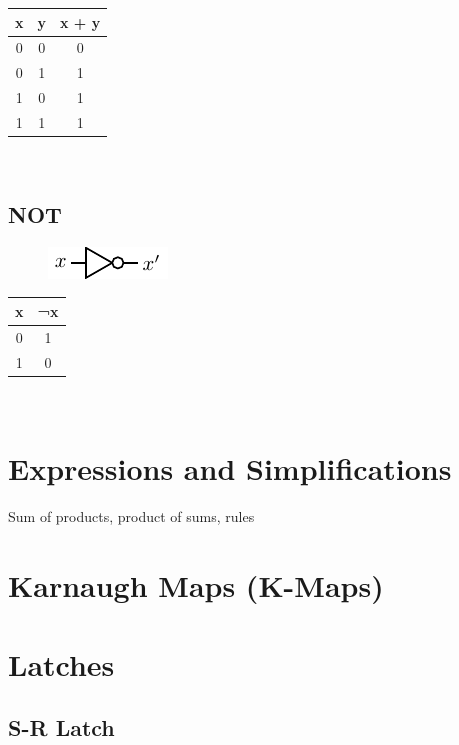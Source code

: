 \begin{tabular}{c c c}
	\hline
	\textbf{x} & \textbf{y} & \textbf{x + y} \\ 
	\hline
	0 & 0 & 0 \\
	0 & 1 & 1 \\
	1 & 0 & 1 \\
	1 & 1 & 1 \\
	\hline 
\end{tabular} \\

\subsection{NOT}

\begin{figure}[h!]
	\includegraphics{./img/not.png}
\end{figure}


\begin{tabular}{c c}
	\hline
	\textbf{x} & \textbf{¬x} \\ 
	\hline
	0 & 1  \\
	1 & 0  \\
	\hline 
\end{tabular} \\

\section{Expressions and Simplifications}

Sum of products, product of sums, rules

\section{Karnaugh Maps (K-Maps)}

\section{Latches}

\subsection{S-R Latch}

